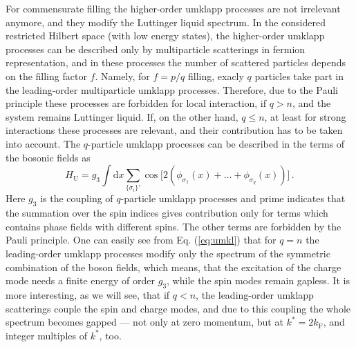 \documentclass[aps,prb,twocolumn,floatfix,showpacs]{revtex4}
\begin{document}
For commensurate filling the higher-order umklapp processes are not irrelevant
anymore, and they modify the Luttinger liquid spectrum. In the considered
restricted Hilbert space (with low energy states), the higher-order umklapp
processes can be described only by multiparticle scatterings in fermion
representation, and in these processes the number of scattered particles
depends on the filling factor $f$. Namely, for $f=p/q$ filling, exacly $q$
particles take part in the leading-order multiparticle umklapp
processes. Therefore, due to the Pauli principle these processes are forbidden
for local interaction, if $q>n$, and the system remains Luttinger liquid. If,
on the other hand, $q\leq n$, at least for strong interactions these processes
are relevant, and their contribution has to be taken into account. The
$q$-particle umklapp processes can be described in the terms of the bosonic
fields as
\begin{equation}
\label{eq:umkl}
H_{\mathrm{U}} = g_3 \int \textrm{d}x \sum_{\{\sigma_i\}'}
\cos\big[2\left(\phi_{\sigma_1}(x)+\ldots +\phi_{\sigma_q}(x)\right)\big] \,.
\end{equation}
Here $g_3$ is the coupling of $q$-particle umklapp processes and prime
indicates that the summation over the spin indices gives contribution only for
terms which contains phase fields with different spins. The other terms are
forbidden by the Pauli principle. One can easily see from Eq. (\ref{eq:umkl})
that for $q=n$ the leading-order um\-klapp processes modify only the spectrum
of the symmetric combination of the boson fields, which means, that the
excitation of the charge mode needs a finite energy of order $g_3$, while the
spin modes remain gapless. It is more interesting, as we will see, that if
$q<n$, the leading-order umklapp scatterings couple the spin and charge modes,
and due to this coupling the whole spectrum becomes gapped --- not only at
zero momentum, but at $k^* = 2k_{\mathrm{F}}$, and integer multiples of $k^*$,
too.

\end{document}
